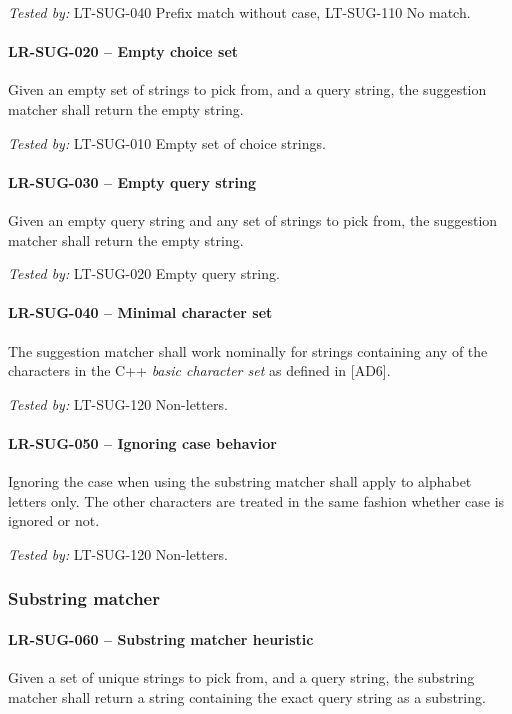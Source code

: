 \textit{Tested by: } LT-SUG-040 Prefix match without case,
LT-SUG-110 No match.

\paragraph{LR-SUG-020 -- Empty choice set}
Given an empty set of strings to pick from, and a query string,
the suggestion matcher shall return the empty string.

\textit{Tested by: } LT-SUG-010 Empty set of choice strings.

\paragraph{LR-SUG-030 -- Empty query string}
Given an empty query string and any set of strings to pick from,
the suggestion matcher shall return the empty string.

\textit{Tested by: } LT-SUG-020 Empty query string.

\paragraph{LR-SUG-040 -- Minimal character set}
The suggestion matcher shall work nominally for strings containing
any of the characters in the C++ \emph{basic character set} as
defined in [AD6].

\textit{Tested by: } LT-SUG-120 Non-letters.

\paragraph{LR-SUG-050 -- Ignoring case behavior}
Ignoring the case when using the substring matcher shall apply
to alphabet letters only. The other characters are treated
in the same fashion whether case is ignored or not.

\textit{Tested by: } LT-SUG-120 Non-letters.

\subsubsection{Substring matcher}
\paragraph{LR-SUG-060 -- Substring matcher heuristic}
Given a set of unique strings to pick from, and a query string,
the substring matcher shall return a string containing the
exact query string as a substring.

